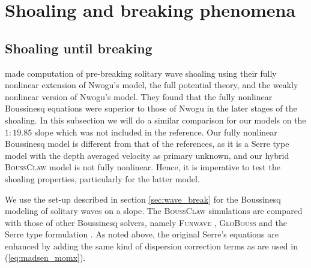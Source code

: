 \documentclass[review]{elsarticle}
\newcommand{\BoussClaw}{\textsc{BoussClaw} }
\begin{document}


\section{Shoaling and breaking phenomena}
\label{sec:shoaling_breaking}

\subsection{Shoaling until breaking}
\label{sec:num_shoaling}
\citet{wei1995fully} made computation of pre-breaking solitary wave shoaling using
 their fully nonlinear extension of Nwogu's model, the full potential 
theory, and the weakly nonlinear version of Nwogu's model.
They found that the fully nonlinear Boussinesq equations were superior to those of Nwogu in the later stages of the shoaling.
In this subsection we will do a similar comparison for our models on the $1:19.85$ slope which was not included in the reference. Our fully nonlinear Boussinesq model is different from that of the references, as it is a Serre type model with the depth averaged velocity as primary unknown, 
and our hybrid \BoussClaw model is not fully nonlinear. Hence, it is imperative
to test the shoaling properties, particularly for the latter model.   
 
We use the set-up described in section \ref{sec:wave_break} for the Boussinesq modeling of solitary waves on a slope. 
The \BoussClaw simulations are compared
with those of other Boussinesq solvers, namely
 \textsc{Funwave} \citep{shi2012high}, \textsc{GloBouss} \citep{lovholt2010coupling} and the Serre type formulation \citep{Lovholt:2013a}.
As noted above, 
the original Serre's equations are enhanced by adding the same kind of dispersion correction terms as are used in 
(\ref{eq:madsen_momx}). 
\end{document}
